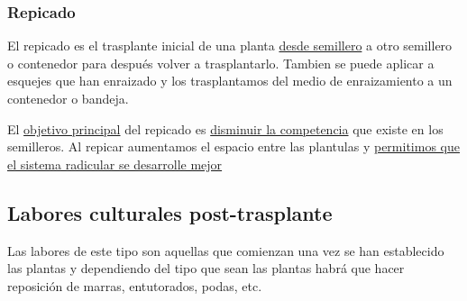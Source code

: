 \documentclass[a4paper,12pt,oneside]{article}
\begin{document}
\subsubsection{Repicado}
\label{sec:org7a530a1}
El repicado es el trasplante inicial de una planta \uline{desde semillero} a otro
semillero o contenedor para después volver a trasplantarlo. Tambien se puede
aplicar a esquejes que han enraizado y los trasplantamos del medio de
enraizamiento a un contenedor o bandeja.

El \uline{objetivo principal} del repicado es \uline{disminuir la competencia} que existe en
los semilleros. Al repicar aumentamos el espacio entre las plantulas y
\uline{permitimos que el sistema radicular se desarrolle mejor}

\subsection{Labores culturales post-trasplante}
\label{sec:orgd8b7743}
Las labores de este tipo son aquellas que comienzan una vez se han establecido
las plantas y dependiendo del tipo que sean las plantas habrá que hacer
reposición de marras, entutorados, podas, etc. 
\end{document}
